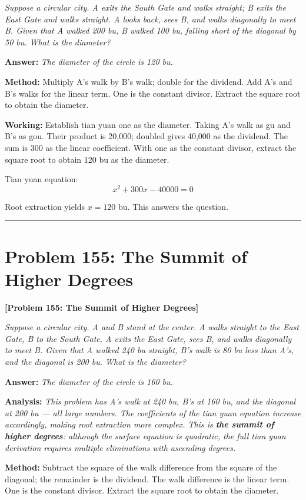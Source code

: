 \documentclass[11pt,a4paper]{book}
\newcommand{\answer}[1]{\noindent\textbf{\color{anacolor}Answer: }\textit{#1}\par}
\newcommand{\method}[1]{\noindent\textbf{\color{methodcolor}Method: }#1\par}
\newcommand{\working}[1]{\noindent\textbf{\color{workcolor}Working: }#1\par}
\newcommand{\analysis}[1]{\noindent\textbf{\color{anacolor}Analysis: }\textit{#1}\par}
\newcommand{\shortline}{\noindent\rule{0.5\textwidth}{0.4pt}\par}
\begin{document}
\textit{Suppose a circular city. A exits the South Gate and walks straight; B exits the East Gate and walks straight. A looks back, sees B, and walks diagonally to meet B. Given that A walked 200 bu, B walked 100 bu, falling short of the diagonal by 50 bu. What is the diameter?}

\answer{The diameter of the circle is 120 bu.}

\method{Multiply A's walk by B's walk; double for the dividend. Add A's and B's walks for the linear term. One is the constant divisor. Extract the square root to obtain the diameter.}

\working{Establish tian yuan one as the diameter. Taking A's walk as gu and B's as gou. Their product is 20,000; doubled gives 40,000 as the dividend. The sum is 300 as the linear coefficient. With one as the constant divisor, extract the square root to obtain 120 bu as the diameter.

Tian yuan equation:
$$x^2 + 300x - 40000 = 0$$

Root extraction yields $x = 120$ bu. This answers the question.}

\shortline

\section{Problem 155: The Summit of Higher Degrees}
\label{sec:prob155}

\noindent\textbf{\color{probcolor}[Problem 155: The Summit of Higher Degrees]}

\textit{Suppose a circular city. A and B stand at the center. A walks straight to the East Gate, B to the South Gate. A exits the East Gate, sees B, and walks diagonally to meet B. Given that A walked 240 bu straight, B's walk is 80 bu less than A's, and the diagonal is 200 bu. What is the diameter?}

\answer{The diameter of the circle is 160 bu.}

\analysis{This problem has A's walk at 240 bu, B's at 160 bu, and the diagonal at 200 bu --- all large numbers. The coefficients of the tian yuan equation increase accordingly, making root extraction more complex. This is \textbf{the summit of higher degrees}: although the surface equation is quadratic, the full tian yuan derivation requires multiple eliminations with ascending degrees.}

\method{Subtract the square of the walk difference from the square of the diagonal; the remainder is the dividend. The walk difference is the linear term. One is the constant divisor. Extract the square root to obtain the diameter.}
\end{document}
